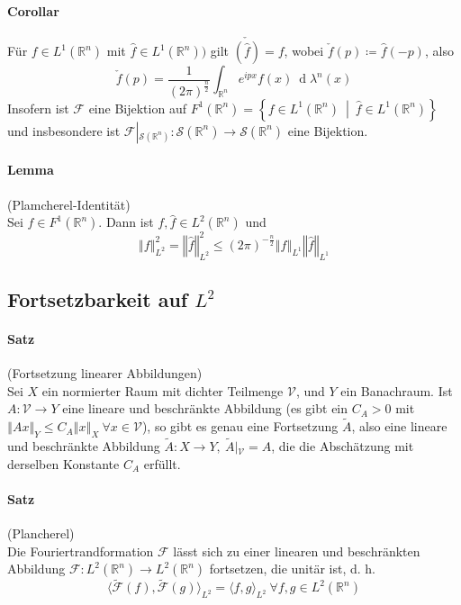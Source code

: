 \documentclass[12pt,a4paper,fleqn]{article}
\def\norm#1{{\left\Vert #1 \right\Vert}}
\def\set#1{{\left\{ #1 \right\}}}
\def\Mid{\ \middle|\ }
\def\R{{\mathbb{R}}}
\def\d{{\operatorname{d}}}
\begin{document}
\paragraph{Corollar}  Für $f \in L^1(\R^n)$ mit $\widehat{f} \in L^1(\R^n))$ gilt $\check{(\widehat{f})} = f$, wobei $\check{f}(p) \coloneqq \widehat{f}(-p)$, also 
\begin{displaymath}
\check{f}(p) = \frac{1}{(2\pi)^{\frac{n}{2}}} \int_{\R^n} e^{ipx}f(x)\ \d\lambda^n(x)
\end{displaymath}
Insofern ist $\mathscr{F}$ eine Bijektion auf $F^1(\R^n) = \set{f \in L^1(\R^n) \Mid \widehat{f} \in L^1(\R^n)}$ und insbesondere ist $\mathscr{F}\left\vert_{\mathscr{S}(\R^n)}\right. \colon \mathscr{S}(\R^n) \rightarrow \mathscr{S}(\R^n)$ eine Bijektion.

\paragraph{Lemma} (Plamcherel-Identität)\\
Sei $f \in F^1(\R^n)$. Dann ist $f, \widehat{f} \in L^2(\R^n)$ und 
\begin{displaymath}
\norm{f}^2_{L^2} = \norm{\widehat{f}}^2_{L^2} \leq (2\pi)^{-\frac{n}{2}} \norm{f}_{L^1} \norm{\widehat{f}}_{L^1}
\end{displaymath}

\subsection{Fortsetzbarkeit auf $L^2$}

\paragraph{Satz} (Fortsetzung linearer Abbildungen)\\
Sei $X$ ein normierter Raum mit dichter Teilmenge $\mathscr{V}$, und $Y$ ein Banachraum.
Ist $A\colon \mathscr{V} \rightarrow Y$ eine lineare und beschränkte Abbildung (es gibt ein $C_A > 0$ mit $\norm{Ax}_Y \leq C_A \norm{x}_X\ \forall x \in \mathscr{V}$), so gibt es genau eine Fortsetzung $\widetilde{A}$, also eine lineare und beschränkte Abbildung $\widetilde{A}\colon X \rightarrow Y,\ \widetilde{A}\left\vert_{\mathscr{V}}\right. = A$, die die Abschätzung mit derselben Konstante $C_A$ erfüllt.

\paragraph{Satz} (Plancherel)\\
Die Fouriertrandformation $\mathscr{F}$ lässt sich zu einer linearen und beschränkten Abbildung $\mathscr{F} \colon L^2(\R^n) \rightarrow L^2(\R^n)$ fortsetzen, die unitär ist, d. h.
\begin{displaymath}
\langle\widetilde{\mathscr{F}}(f), \widetilde{\mathscr{F}}(g)\rangle_{L^2} = \langle f, g\rangle_{L^2}\ \forall f, g \in L^2(\R^n)
\end{displaymath}
\end{document}
